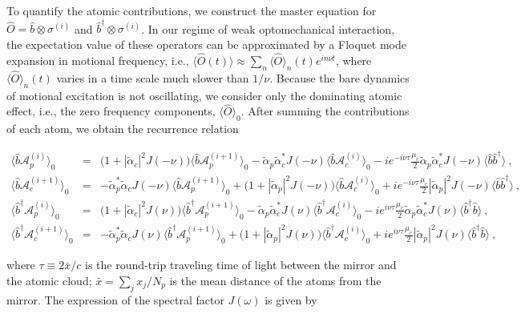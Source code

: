 \documentclass[aps, pra, reprint, amsmath, amssymb, groupedaddress, acknowledgments]{revtex4-1}
\begin{document}
To quantify the atomic contributions, we construct the master equation for $\hat{O} = \hat{b}\otimes \sigma^{(i)}$ and $\hat{b}^\dag \otimes \sigma^{(i)}$.  In our regime of weak optomechanical interaction, the expectation value of these operators can be approximated by a Floquet mode expansion in motional frequency, i.e., $\langle \hat{O}(t)\rangle \approx \sum_n \langle \hat{O}\rangle_n (t) e^{i n \nu t}$, where $\langle \hat{O}\rangle_n (t)$ varies in a time scale much slower than $1/\nu$.  Because the bare dynamics of motional excitation is not oscillating, we consider only the dominating atomic effect, i.e., the zero frequency components, $\langle\hat{O}\rangle_0$.
After summing the contributions of each atom, we obtain the recurrence relation
\begin{widetext}
\begin{eqnarray}
\langle \hat{b} \mathcal{A}_p^{(i)} \rangle_0 &=& \Big(1+ |\tilde{\alpha}_c|^2J(-\nu)\Big) \langle \hat{b}\mathcal{A}_p^{(i+1)} \rangle_0 -  \tilde{\alpha}_p\tilde{\alpha}_c^\ast J(-\nu) \langle \hat{b}\mathcal{A}_c^{(i)} \rangle_0 - i e^{-i\nu\tau} \frac{\mu_c}{2} \tilde{\alpha}_p\tilde{\alpha}_c^\ast J(-\nu) \langle\hat{b} \hat{b}^\dag\rangle~, \label{eq:Apb2}\\
\langle \hat{b}\mathcal{A}_c^{(i+1)}\rangle_0 &=& - \tilde{\alpha}_p^\ast \tilde{\alpha}_c J(-\nu) \langle \hat{b}\mathcal{A}_p^{(i+1)} \rangle_0 +\Big(1+ |\tilde{\alpha}_p|^2 J(-\nu) \Big) \langle \hat{b}\mathcal{A}_c^{(i)} \rangle_0 + i e^{-i\nu\tau} \frac{\mu_c}{2} |\tilde{\alpha}_p|^2 J(-\nu) \langle\hat{b}\hat{b}^\dag\rangle ~, \label{eq:Acb2} \\
\langle \hat{b}^\dag \mathcal{A}_p^{(i)} \rangle_0 &=& \Big(1+ |\tilde{\alpha}_c|^2J(\nu)\Big) \langle \hat{b}^\dag\mathcal{A}_p^{(i+1)} \rangle_0 -  \tilde{\alpha}_p\tilde{\alpha}_c^\ast J(\nu) \langle \hat{b}^\dag\mathcal{A}_c^{(i)} \rangle_0 - ie^{i\nu\tau} \frac{\mu_c}{2} \tilde{\alpha}_p\tilde{\alpha}_c^\ast J(\nu) \langle\hat{b}^\dag \hat{b} \rangle~, \label{eq:Apbd2} \\
\langle\hat{b}^\dag\mathcal{A}_c^{(i+1)}\rangle_0 &=& - \tilde{\alpha}_p^\ast \tilde{\alpha}_c J(\nu) \langle \hat{b}^\dag\mathcal{A}_p^{(i+1)} \rangle_0 +\Big(1+ |\tilde{\alpha}_p|^2 J(\nu) \Big) \langle \hat{b}^\dag\mathcal{A}_c^{(i)} \rangle_0 + i e^{i\nu\tau} \frac{\mu_c}{2} |\tilde{\alpha}_p|^2 J(\nu) \langle\hat{b}^\dag\hat{b}\rangle ~, \label{eq:Acbd2}
\end{eqnarray}
\end{widetext}
where $\tau \equiv 2 \bar{x}/c$ is the round-trip traveling time of light between the mirror and the atomic cloud; $\bar{x} = \sum_j x_j/N_p$ is the mean distance of the atoms from the mirror.  The expression of the spectral factor $J(\omega)$ is given by
\end{document}
